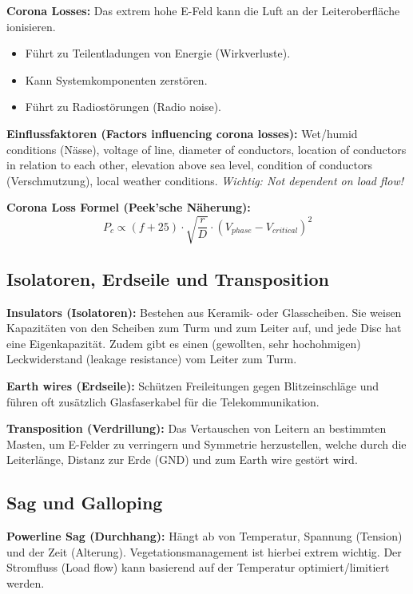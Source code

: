 \documentclass[11pt, a4paper]{article}
\begin{document}
\textbf{Corona Losses:}
Das extrem hohe E-Feld kann die Luft an der Leiteroberfläche ionisieren.
\begin{itemize}
    \item Führt zu Teilentladungen von Energie (Wirkverluste).
    \item Kann Systemkomponenten zerstören.
    \item Führt zu Radiostörungen (Radio noise).
\end{itemize}

\textbf{Einflussfaktoren (Factors influencing corona losses):}
Wet/humid conditions (Nässe), voltage of line, diameter of conductors, location of conductors in relation to each other, elevation above sea level, condition of conductors (Verschmutzung), local weather conditions. \textit{Wichtig: Not dependent on load flow!}

\textbf{Corona Loss Formel (Peek'sche Näherung):}
\begin{equation}
    P_c \propto (f + 25) \cdot \sqrt{\frac{r}{D}} \cdot (V_{phase} - V_{critical})^2
\end{equation}

\subsection{Isolatoren, Erdseile und Transposition}
\textbf{Insulators (Isolatoren):}
Bestehen aus Keramik- oder Glasscheiben. Sie weisen Kapazitäten von den Scheiben zum Turm und zum Leiter auf, und jede Disc hat eine Eigenkapazität. Zudem gibt es einen (gewollten, sehr hochohmigen) Leckwiderstand (leakage resistance) vom Leiter zum Turm.

\textbf{Earth wires (Erdseile):}
Schützen Freileitungen gegen Blitzeinschläge und führen oft zusätzlich Glasfaserkabel für die Telekommunikation.

\textbf{Transposition (Verdrillung):}
Das Vertauschen von Leitern an bestimmten Masten, um E-Felder zu verringern und Symmetrie herzustellen, welche durch die Leiterlänge, Distanz zur Erde (GND) und zum Earth wire gestört wird.

\subsection{Sag und Galloping}
\textbf{Powerline Sag (Durchhang):}
Hängt ab von Temperatur, Spannung (Tension) und der Zeit (Alterung). Vegetationsmanagement ist hierbei extrem wichtig. Der Stromfluss (Load flow) kann basierend auf der Temperatur optimiert/limitiert werden.
\end{document}
